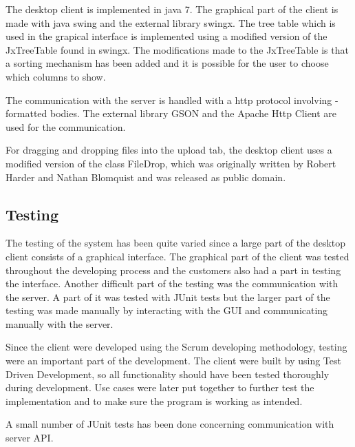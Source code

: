 The desktop client is implemented in java 7. The graphical part of the client is made with java swing and the external library swingx. The tree table which is used in the grapical interface is implemented using a modified version of the JxTreeTable found in swingx. The modifications made to the JxTreeTable is that a sorting mechanism has been added and it is possible for the user to choose which columns to show.

The communication with the server is handled with a http protocol involving \json-formatted bodies. The external library GSON and the Apache Http Client are used for the communication.

For dragging and dropping files into the upload tab, the desktop client uses a modified version of the class FileDrop, which was originally written by Robert Harder and Nathan Blomquist and was released as public domain.

\subsection{Testing}

The testing of the system has been quite varied since a large part of the desktop client consists of a graphical interface. The graphical part of the client was tested throughout the developing process and the customers also had a part in testing the interface. Another difficult part of the testing was the communication with the server. A part of it was tested with JUnit tests but the larger part of the testing was made manually by interacting with the GUI and communicating manually with the server.

Since the client were developed using the Scrum developing methodology, testing were an important part of the development. The client were built by using Test Driven Development, so all functionality should have been tested thoroughly during development. Use cases were later put together to further test the implementation and to make sure the program is working as intended.

A small number of JUnit tests has been done concerning communication with server API.

\FloatBarrier
